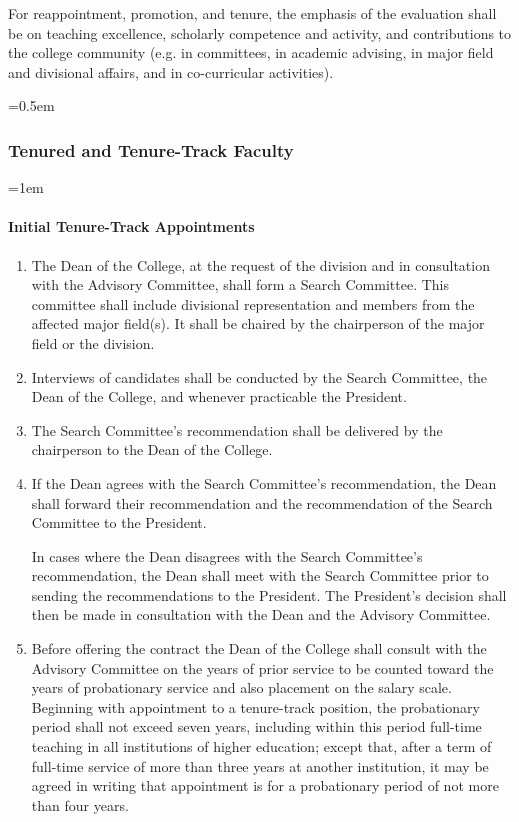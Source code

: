 \documentclass{manual}
\let\oldsubsubsection\subsubsection
\renewcommand\subsubsection{\leftskip=0.5em\oldsubsubsection}
\let\oldparagraph\paragraph
\renewcommand\paragraph{\leftskip=1em\oldparagraph}
\newcommand{\itemLevelA}{\alph*.}
\newcommand{\itemRefA}{\alph*}
\begin{document}
For reappointment, promotion, and tenure, the emphasis of the evaluation shall be on teaching excellence, scholarly competence and activity, and contributions to the college community (e.g. in committees, in academic advising, in major field and divisional affairs, and in co-curricular activities).

\subsubsection{Tenured and Tenure-Track Faculty}\label{sub:TenuredAndTenureTrackFaculty}

\paragraph{Initial Tenure-Track Appointments}
\begin{enumerate}[label=\itemLevelA,ref=\itemRefA]

\item The Dean of the College, at the request of the division and in consultation with the Advisory Committee, shall form a Search Committee. This committee shall include divisional representation and members from the affected major field(s). It shall be chaired by the chairperson of the major field or the division.

\item Interviews of candidates shall be conducted by the Search Committee, the Dean of the College, and whenever practicable the President.

\item The Search Committee's recommendation shall be delivered by the chairperson to the Dean of the College.

\item If the Dean agrees with the Search Committee's recommendation, the Dean shall forward their recommendation and the recommendation of the Search Committee to the President.

In cases where the Dean disagrees with the Search Committee's recommendation, the Dean shall meet with the Search Committee prior to sending the recommendations to the President. The President's decision shall then be made in consultation with the Dean and the Advisory Committee.

\item Before offering the contract the Dean of the College shall consult with the Advisory Committee on the years of prior service to be counted toward the years of probationary service and also placement on the salary scale. Beginning with appointment to a tenure-track position, the probationary period shall not exceed seven years, including within this period full-time teaching in all institutions of higher education; except that, after a term of full-time service of more than three years at another institution, it may be agreed in writing that appointment is for a probationary period of not more than four years.


\end{enumerate}
\end{document}
